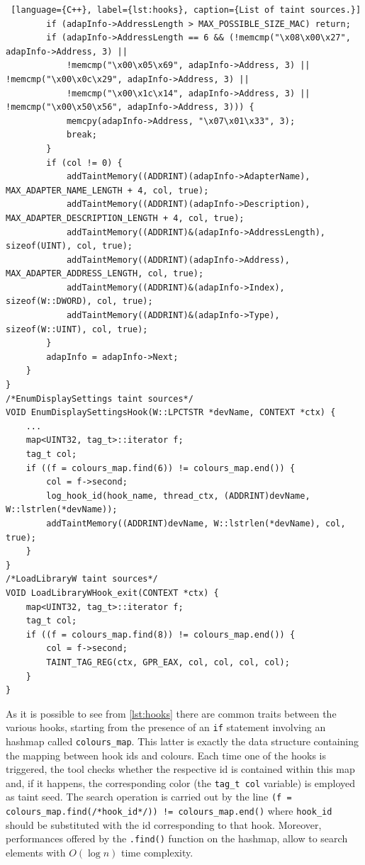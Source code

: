 \documentclass[LaM,binding=0.6cm]{sapthesis}
\begin{document}
\begin{lstlisting} [language={C++}, label={lst:hooks}, caption={List of taint sources.}]
		if (adapInfo->AddressLength > MAX_POSSIBLE_SIZE_MAC) return;
		if (adapInfo->AddressLength == 6 && (!memcmp("\x08\x00\x27", adapInfo->Address, 3) ||
			!memcmp("\x00\x05\x69", adapInfo->Address, 3) || !memcmp("\x00\x0c\x29", adapInfo->Address, 3) ||
			!memcmp("\x00\x1c\x14", adapInfo->Address, 3) || !memcmp("\x00\x50\x56", adapInfo->Address, 3))) {
			memcpy(adapInfo->Address, "\x07\x01\x33", 3);
			break;
		}
		if (col != 0) {
			addTaintMemory((ADDRINT)(adapInfo->AdapterName), MAX_ADAPTER_NAME_LENGTH + 4, col, true);
			addTaintMemory((ADDRINT)(adapInfo->Description), MAX_ADAPTER_DESCRIPTION_LENGTH + 4, col, true);
			addTaintMemory((ADDRINT)&(adapInfo->AddressLength), sizeof(UINT), col, true);
			addTaintMemory((ADDRINT)(adapInfo->Address), MAX_ADAPTER_ADDRESS_LENGTH, col, true);
			addTaintMemory((ADDRINT)&(adapInfo->Index), sizeof(W::DWORD), col, true);
			addTaintMemory((ADDRINT)&(adapInfo->Type), sizeof(W::UINT), col, true);
		}
		adapInfo = adapInfo->Next;
	}
}
/*EnumDisplaySettings taint sources*/
VOID EnumDisplaySettingsHook(W::LPCTSTR *devName, CONTEXT *ctx) {
	...
	map<UINT32, tag_t>::iterator f;
	tag_t col;
	if ((f = colours_map.find(6)) != colours_map.end()) {
		col = f->second;
		log_hook_id(hook_name, thread_ctx, (ADDRINT)devName, W::lstrlen(*devName));
		addTaintMemory((ADDRINT)devName, W::lstrlen(*devName), col, true);
	}
}
/*LoadLibraryW taint sources*/
VOID LoadLibraryWHook_exit(CONTEXT *ctx) {
	map<UINT32, tag_t>::iterator f;
	tag_t col;
	if ((f = colours_map.find(8)) != colours_map.end()) {
		col = f->second;
		TAINT_TAG_REG(ctx, GPR_EAX, col, col, col, col);
	}
}
\end{lstlisting}
As it is possible to see from \autoref{lst:hooks} there are common traits between the various hooks, starting from the presence of an \texttt{if} statement involving an hashmap called \texttt{colours\_map}. This latter is exactly the data structure containing the mapping between hook ids and colours. Each time one of the hooks is triggered, the tool checks whether the respective id is contained within this map and, if it happens, the corresponding color (the \texttt{tag\_t col} variable) is employed as taint seed. The search operation is carried out by the line \texttt{(f = colours\_map.find(/*hook\_id*/)) != colours\_map.end()} where \texttt{hook\_id} should be substituted with the id corresponding to that hook. Moreover, performances offered by the \texttt{.find()} function on the hashmap, allow to search elements with $O(\log n)$ time complexity.
\end{document}
